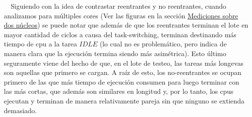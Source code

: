 \ \ Siguiendo con la idea de contrastar reentrantes y no reentrantes, cuando analizamos para múltiples cores (Ver las figuras en la sección \hyperref[fig:ej8-cpu-rr-m]{Mediciones sobre dos núcleos}) se puede notar que además de que los reentrantes terminan el lote en mayor cantidad de ciclos a causa del task-switching, terminan destinando más tiempo de cpu a la tarea $IDLE$ (lo cual no es problemático, pero indica de manera clara que la ejecución termina siendo más asimétrica). Esto último seguramente viene del hecho de que, en el lote de testeo, las tareas más longevas son aquellas que primero se cargan. A raíz de esto, los no-reentrantes se ocupan primero de las que más tiempo de ejecución consumen para luego terminar con las más cortas, que además son similares en longitud y, por lo tanto, los cpus ejecutan y terminan de manera relativamente pareja sin que ninguno se extienda demasiado.